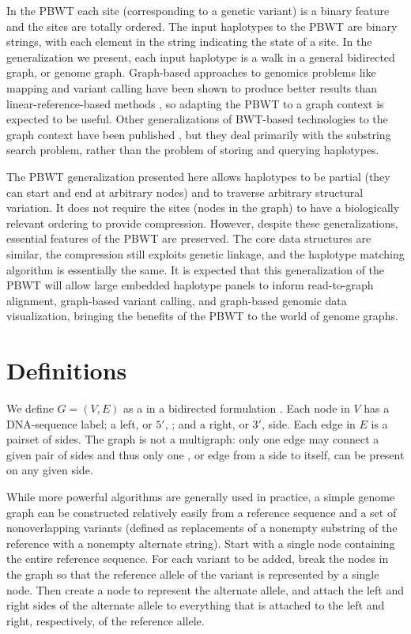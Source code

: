 In the PBWT each site (corresponding to a genetic variant) is a binary feature and the sites are totally ordered. The input haplotypes to the PBWT are binary strings, with each element in the string indicating the state of a site. In the generalization we present, each input haplotype is a walk in a general bidirected graph, or genome graph. Graph-based approaches to genomics problems like mapping and variant calling have been shown to produce better results than linear-reference-based methods \cite{dilthey2015improved,novak2017genome}, so adapting the PBWT to a graph context is expected to be useful. Other generalizations of BWT-based technologies to the graph context have been published \cite{siren2017indexing,maciuca2016natural,huang2013short}, but they deal primarily with the substring search problem, rather than the problem of storing and querying haplotypes.

The PBWT generalization presented here allows haplotypes to be partial (they can start and end at arbitrary nodes) and to traverse arbitrary structural variation. It does not require the sites (nodes in the graph) to have a biologically relevant ordering to provide compression.
However, despite these generalizations, essential features of the PBWT are preserved. The core data structures are similar, the compression still exploits genetic linkage, and the haplotype matching algorithm is essentially the same. It is expected that this generalization of the PBWT will allow large embedded haplotype panels to inform read-to-graph alignment, graph-based variant calling, and graph-based genomic data visualization, bringing the benefits of the PBWT to the world of genome graphs.

\section{Definitions}

We define $G = (V, E)$ as a  in a bidirected formulation \cite{medvedev2009maximum, paten2014mapping}. Each node in $V$ has a DNA-sequence label; a left, or $5'$, ; and a right, or $3'$, side. Each edge in $E$ is a pairset of sides. The graph is not a multigraph: only one edge may connect a given pair of sides and thus only one , or edge from a side to itself, can be present on any given side.

While more powerful algorithms are generally used in practice, a simple genome graph can be constructed relatively easily from a reference sequence and a set of nonoverlapping variants (defined as replacements of a nonempty substring of the reference with a nonempty alternate string). Start with a single node containing the entire reference sequence. For each variant to be added, break the nodes in the graph so that the reference allele of the variant is represented by a single node. Then create a node to represent the alternate allele, and attach the left and right sides of the alternate allele to everything that is attached to the left and right, respectively, of the reference allele.

